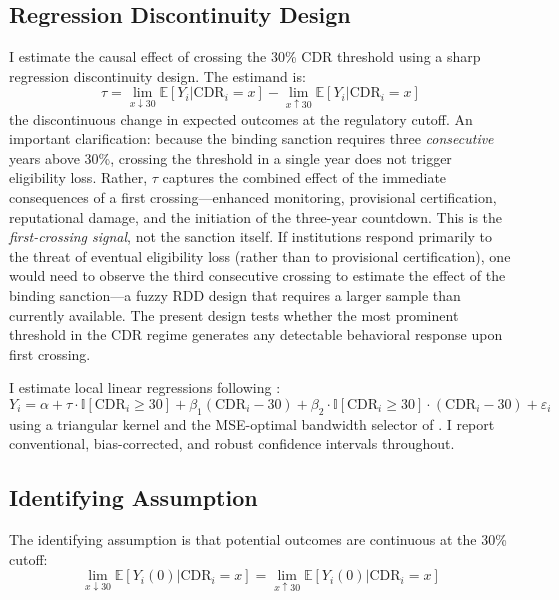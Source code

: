 \documentclass[12pt]{article}
\newcommand{\E}{\mathbb{E}}
\newcommand{\ind}{\mathbb{I}}
\begin{document}
\subsection{Regression Discontinuity Design}

I estimate the causal effect of crossing the 30\% CDR threshold using a sharp regression discontinuity design. The estimand is:
\begin{equation}
\tau = \lim_{x \downarrow 30} \E[Y_i | \text{CDR}_i = x] - \lim_{x \uparrow 30} \E[Y_i | \text{CDR}_i = x]
\end{equation}
the discontinuous change in expected outcomes at the regulatory cutoff. An important clarification: because the binding sanction requires three \textit{consecutive} years above 30\%, crossing the threshold in a single year does not trigger eligibility loss. Rather, $\tau$ captures the combined effect of the immediate consequences of a first crossing---enhanced monitoring, provisional certification, reputational damage, and the initiation of the three-year countdown. This is the \textit{first-crossing signal}, not the sanction itself. If institutions respond primarily to the threat of eventual eligibility loss (rather than to provisional certification), one would need to observe the third consecutive crossing to estimate the effect of the binding sanction---a fuzzy RDD design that requires a larger sample than currently available. The present design tests whether the most prominent threshold in the CDR regime generates any detectable behavioral response upon first crossing.

I estimate local linear regressions following \citet{calonico2020}:
\begin{equation}
Y_i = \alpha + \tau \cdot \ind[\text{CDR}_i \geq 30] + \beta_1 (\text{CDR}_i - 30) + \beta_2 \cdot \ind[\text{CDR}_i \geq 30] \cdot (\text{CDR}_i - 30) + \varepsilon_i
\end{equation}
using a triangular kernel and the MSE-optimal bandwidth selector of \citet{calonico2020}. I report conventional, bias-corrected, and robust confidence intervals throughout.

\subsection{Identifying Assumption}

The identifying assumption is that potential outcomes are continuous at the 30\% cutoff:
\begin{equation}
\lim_{x \downarrow 30} \E[Y_i(0) | \text{CDR}_i = x] = \lim_{x \uparrow 30} \E[Y_i(0) | \text{CDR}_i = x]
\end{equation}
\end{document}
